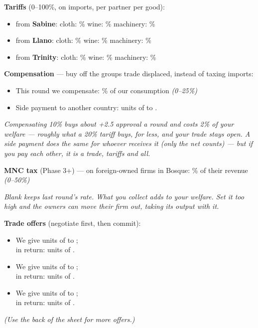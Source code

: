 \documentclass[11pt]{article}
\newcommand{\blank}[1]{\underline{\hspace{#1}}}
\begin{document}
\vspace{4pt}
{\bfseries Tariffs} (0--100\%, on imports, per partner per good):\par
\begin{itemize}[nosep,leftmargin=1.4em]
  \item from \textbf{Sabine}: \quad cloth: \blank{1.4cm}\% \quad wine: \blank{1.4cm}\% \quad machinery: \blank{1.4cm}\%
  \item from \textbf{Llano}: \quad cloth: \blank{1.4cm}\% \quad wine: \blank{1.4cm}\% \quad machinery: \blank{1.4cm}\%
  \item from \textbf{Trinity}: \quad cloth: \blank{1.4cm}\% \quad wine: \blank{1.4cm}\% \quad machinery: \blank{1.4cm}\%
\end{itemize}

\vspace{4pt}
{\bfseries Compensation} --- buy off the groups trade displaced, instead of taxing imports:\par
\begin{itemize}[nosep,leftmargin=1.4em]
  \item This round we compensate: \blank{1.4cm}\% of our consumption \quad \textit{(0--25\%)}
  \item Side payment to another country: \blank{1.6cm} units of \blank{2cm} to \blank{2.2cm}.
\end{itemize}
\textit{Compensating 10\% buys about +2.5 approval a round and costs 2\% of your welfare --- roughly what a 20\% tariff buys, for less, and your trade stays open. A side payment does the same for whoever receives it (only the net counts) --- but if you pay each other, it is a trade, tariffs and all.}

\vspace{4pt}
{\bfseries MNC tax} (Phase 3+) --- on foreign-owned firms in Bosque: \blank{1.4cm}\% of their revenue \quad \textit{(0--50\%)}\par
\textit{Blank keeps last round's rate. What you collect adds to your welfare. Set it too high and the owners can move their firm out, taking its output with it.}

\vspace{4pt}
{\bfseries Trade offers} (negotiate first, then commit):\par
\begin{itemize}[itemsep=4pt,leftmargin=1.4em]
  \item We give \blank{1.8cm} units of \blank{2.2cm} to \blank{2.2cm};\\[2pt] in return: \blank{1.8cm} units of \blank{2.2cm}.
  \item We give \blank{1.8cm} units of \blank{2.2cm} to \blank{2.2cm};\\[2pt] in return: \blank{1.8cm} units of \blank{2.2cm}.
  \item We give \blank{1.8cm} units of \blank{2.2cm} to \blank{2.2cm};\\[2pt] in return: \blank{1.8cm} units of \blank{2.2cm}.
\end{itemize}
\textit{(Use the back of the sheet for more offers.)}
\end{document}
